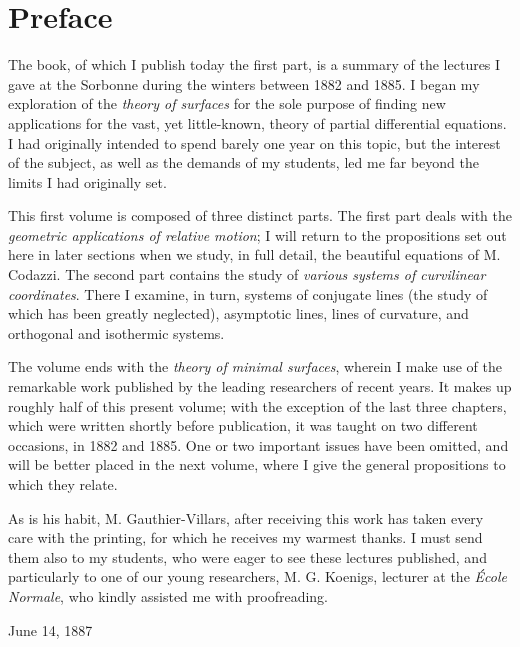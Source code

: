 \documentclass{letter}
\newcommand{\tmtextit}[1]{{\itshape{#1}}}
\begin{document}
\chapter*{Preface}

The book, of which I publish today the first part, is a summary of the
lectures I gave at the Sorbonne during the winters between 1882 and 1885. I
began my exploration of the \tmtextit{theory of surfaces} for the sole purpose
of finding new applications for the vast, yet little-known, theory of partial
differential equations. I had originally intended to spend barely one year on
this topic, but the interest of the subject, as well as the demands of my
students, led me far beyond the limits I had originally set.

This first volume is composed of three distinct parts. The first part deals
with the \tmtextit{geometric applications of relative motion}; I will return
to the propositions set out here in later sections when we study, in full
detail, the beautiful equations of M. Codazzi. The second part contains the
study of \tmtextit{various systems of curvilinear coordinates}. There I
examine, in turn, systems of conjugate lines (the study of which has been
greatly neglected), asymptotic lines, lines of curvature, and orthogonal and
isothermic systems.

The volume ends with the \tmtextit{theory of minimal surfaces}, wherein I make
use of the remarkable work published by the leading researchers of recent
years. It makes up roughly half of this present volume; with the exception of
the last three chapters, which were written shortly before publication, it was
taught on two different occasions, in 1882 and 1885. One or two important
issues have been omitted, and will be better placed in the next volume, where
I give the general propositions to which they relate.

As is his habit, M. Gauthier-Villars, after receiving this work has taken
every care with the printing, for which he receives my warmest thanks. I must
send them also to my students, who were eager to see these lectures published,
and particularly to one of our young researchers, M. G. Koenigs, lecturer at
the \tmtextit{\'Ecole Normale}, who kindly assisted me with proofreading.

\begin{flushright}
  {\small{June{\small{}} 14, 1887}}
\end{flushright}
\end{document}
